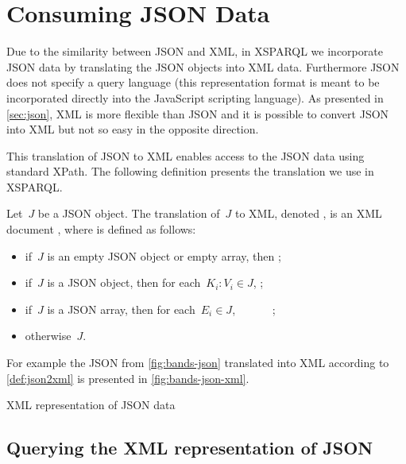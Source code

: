 
\section{Consuming JSON Data}
\label{sec:xsparql-json}

Due to the similarity between \ac{JSON} and \ac{XML}, in XSPARQL we incorporate \ac{JSON} data by translating the
\ac{JSON} objects into \ac{XML} data.
%
Furthermore \ac{JSON} does not specify a query language (this representation format is meant to be incorporated directly
into the JavaScript scripting language).
%
As presented in \cref{sec:json}, \ac{XML} is more flexible than \ac{JSON} and it is possible to convert \ac{JSON} into
\ac{XML} but not so easy in the opposite direction.  


This translation of \ac{JSON} to \ac{XML} enables access to the \ac{JSON} data using standard \ac{XPath}.  The following
definition presents the translation we use in XSPARQL.
% 
\begin{definition}
  \label{def:json2xml}
  Let~$J$ be a \ac{JSON} object.  The translation of~$J$ to \ac{XML}, denoted , is an \ac{XML}
  document , where  is defined as follows:
  \begin{itemize}[noitemsep]
  \item if~$J$ is an empty \ac{JSON} object or empty array, then \seq{};
  \item if~$J$ is a \ac{JSON} object, then for each~$K_i: V_i \in J$, ;
  \item if~$J$ is a \ac{JSON} array, then for each~$E_i \in J$, \newline ~~~~~~;
  \item otherwise~$J$.
  \end{itemize}
\end{definition}
% 
\noindent For example the \ac{JSON} from \cref{fig:bands-json} translated into \ac{XML} according to
\cref{def:json2xml} is presented in \cref{fig:bands-json-xml}.
%
\begin{data}[t]
  \centering
  
  \caption{XML representation of JSON data}
  \label{fig:bands-json-xml}
\end{data}


\subsection*{Querying the XML representation of JSON}
\label{sec:query-jsonxml-repr}

